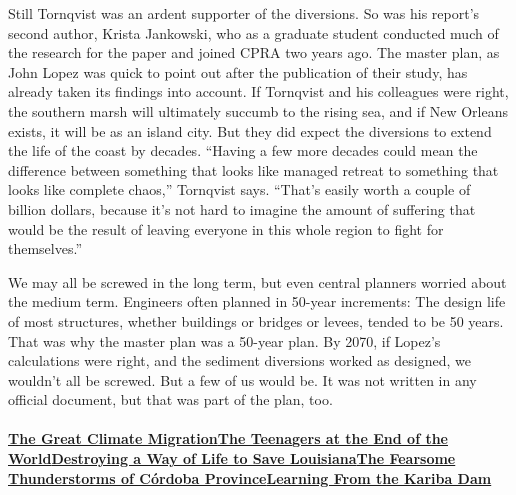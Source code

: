 Still Tornqvist was an ardent supporter of the diversions. So was his
report's second author, Krista Jankowski, who as a graduate student
conducted much of the research for the paper and joined CPRA two years
ago. The master plan, as John Lopez was quick to point out after the
publication of their study, has already taken its findings into account.
If Tornqvist and his colleagues were right, the southern marsh will
ultimately succumb to the rising sea, and if New Orleans exists, it will
be as an island city. But they did expect the diversions to extend the
life of the coast by decades. ``Having a few more decades could mean the
difference between something that looks like managed retreat to
something that looks like complete chaos,'' Tornqvist says. ``That's
easily worth a couple of billion dollars, because it's not hard to
imagine the amount of suffering that would be the result of leaving
everyone in this whole region to fight for themselves.''

We may all be screwed in the long term, but even central planners
worried about the medium term. Engineers often planned in 50-year
increments: The design life of most structures, whether buildings or
bridges or levees, tended to be 50 years. That was why the master plan
was a 50-year plan. By 2070, if Lopez's calculations were right, and the
sediment diversions worked as designed, we wouldn't all be screwed. But
a few of us would be. It was not written in any official document, but
that was part of the plan, too.

\hypertarget{the-great-climate-migrationthe-teenagers-at-the-end-of-the-worlddestroying-a-way-of-life-to-save-louisianathe-fearsome-thunderstorms-of-cuxf3rdoba-provincelearning-from-the-kariba-dam}{%
\paragraph{\texorpdfstring{\href{https://www.nytimes.com/interactive/2020/07/23/magazine/climate-migration.html}{The
Great Climate
Migration}\href{https://www.nytimes.com/interactive/2020/07/21/magazine/teenage-activist-climate-change.html}{The
Teenagers at the End of the
World}\href{https://www.nytimes.com/interactive/2020/07/21/magazine/louisiana-coast-engineering.html}{Destroying
a Way of Life to Save
Louisiana}\href{https://www.nytimes.com/interactive/2020/07/22/magazine/worst-storms-argentina.html}{The
Fearsome Thunderstorms of Córdoba
Province}\href{https://www.nytimes.com/interactive/2020/07/22/magazine/zambia-kariba-dam.html}{Learning
From the Kariba
Dam}}{The Great Climate MigrationThe Teenagers at the End of the WorldDestroying a Way of Life to Save LouisianaThe Fearsome Thunderstorms of Córdoba ProvinceLearning From the Kariba Dam}}\label{the-great-climate-migrationthe-teenagers-at-the-end-of-the-worlddestroying-a-way-of-life-to-save-louisianathe-fearsome-thunderstorms-of-cuxf3rdoba-provincelearning-from-the-kariba-dam}}

